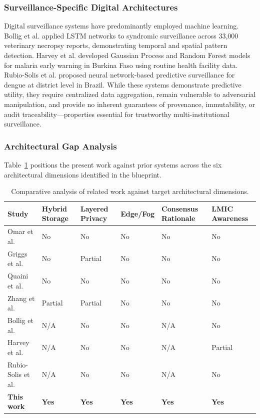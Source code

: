 \documentclass[AMA,LATO1COL]{WileyNJD-v2}
\begin{document}
\subsubsection{Surveillance-Specific Digital Architectures}

Digital surveillance systems have predominantly employed machine learning. Bollig et al.\cite{bollig2020machine} applied LSTM networks to syndromic surveillance across 33,000 veterinary necropsy reports, demonstrating temporal and spatial pattern detection. Harvey et al.\cite{harvey2021predicting} developed Gaussian Process and Random Forest models for malaria early warning in Burkina Faso using routine health facility data. Rubio-Solis et al.\cite{rubiosolis2019zika} proposed neural network-based predictive surveillance for dengue at district level in Brazil. While these systems demonstrate predictive utility, they require centralized data aggregation, remain vulnerable to adversarial manipulation, and provide no inherent guarantees of provenance, immutability, or audit traceability---properties essential for trustworthy multi-institutional surveillance.

\subsubsection{Architectural Gap Analysis}

Table~\ref{tab:related} positions the present work against prior systems across the six architectural dimensions identified in the blueprint.

\begin{table}[!ht]
\caption{Comparative analysis of related work against target architectural dimensions.}\label{tab:related}
\begin{tabular*}{\textwidth}{@{\extracolsep\fill}llllll@{}}
\toprule
Study & Hybrid Storage & Layered Privacy & Edge/Fog & Consensus Rationale & LMIC Awareness \\
\midrule
Omar et al.\cite{omar2019privacy} & No & No & No & No & No \\
Griggs et al.\cite{griggs2018healthcare} & No & Partial & No & No & No \\
Quaini et al.\cite{quaini2018model} & No & No & No & No & No \\
Zhang et al.\cite{zhang2018fhirchain} & Partial & Partial & No & No & No \\
Bollig et al.\cite{bollig2020machine} & N/A & No & No & N/A & No \\
Harvey et al.\cite{harvey2021predicting} & N/A & No & No & N/A & Partial \\
Rubio-Solis et al.\cite{rubiosolis2019zika} & N/A & No & No & N/A & No \\
\textbf{This work} & \textbf{Yes} & \textbf{Yes} & \textbf{Yes} & \textbf{Yes} & \textbf{Yes} \\
\bottomrule
\end{tabular*}
\end{table}
\end{document}
